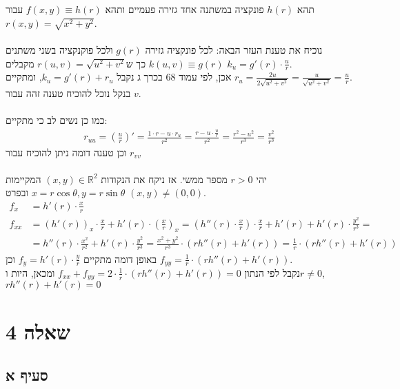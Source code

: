\documentclass{article}
\def\reals{\mathbb{R}}
\begin{document}
תהא $h(r)$ פונקציה במשתנה אחד גזירה פעמיים ותהא $f(x,y)\equiv h(r)$ עבור $r(x,y)=\sqrt{x^2+y^2}$.\\\\
נוכיח את טענת העזר הבאה: לכל פונקציה גזירה $g(r)$ ולכל פוקנקציה בשני משתנים $k(u,v)\equiv g(r)$ כך ש$r(u,v)=\sqrt{u^2+v^2}$ מקבלים $k_u=g'(r) \cdot \frac{u}{r}$. \\
אכן, לפי עמוד 68 בכרך ג נקבל $k_u=g'(r)+r_u$, ומתקיים $r_u=\frac{2u}{2\sqrt{u^2+v^2}}=\frac{u}{\sqrt{u^2+v^2}}=\frac{u}{r}$. \\
בנקל נוכל להוכיח טענה זהה עבור $v$.\\\\
כמו כן נשים לב כי מתקיים:
\begin{align*}
    r_{uu}=(\frac{u}{r})'=\frac{1\cdot r-u\cdot r_u}{r^2}=\frac{r-u\cdot \frac{u}{r}}{r^2}=\frac{r^2-u^2}{r^3}=\frac{v^2}{r^3}
\end{align*}
וכן טענה דומה ניתן להוכיח עבור $r_{vv}$
\\\\
יהי $r>0$ מספר ממשי. אז ניקח את הנקודות $(x,y)\in \reals^2$ המקיימות $x=r\cos \theta, y = r\sin \theta$ ובפרט $(x,y)\ne (0,0)$. \\
\begin{align*}
    f_x    & = h'(r) \cdot \frac{x}{r}                                                 \\
    f_{xx} & = (h'(r))_x \cdot \frac{x}{r} + h'(r) \cdot (\frac{x}{r})_x =
    (h''(r) \cdot \frac{x}{r}) \cdot \frac{x}{r} + h'(r)+h'(r) \cdot \frac{y^2}{r^3} = \\
           & = h''(r) \cdot \frac{x^2}{r^2} + h'(r) \cdot \frac{y^2}{r^3} =
    \frac{x^2+y^2}{r^3} \cdot (rh''(r)+h'(r)) = \frac{1}{r} \cdot (rh''(r)+h'(r))
\end{align*}
באופן דומה מתקיים $f_y=h'(r)\cdot \frac{y}{r}$ וכן $f_{yy}=\frac{1}{r} \cdot (rh''(r)+h'(r))$.\\
נקבל לפי הנתון $f_{xx}+f_{yy}=2\cdot \frac{1}{r} \cdot (rh''(r)+h'(r))=0$ ומכאן, היות ו$r\ne 0$, $rh''(r)+h'(r)=0$

\pagebreak

\section*{שאלה 4}

\subsection*{סעיף א}
\end{document}
